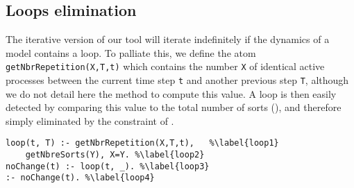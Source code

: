 \subsection{Loops elimination}
\label{sec:loops}

The iterative version of our tool will iterate indefinitely if the dynamics of a model contains a loop.
To palliate this,
we define the atom \texttt{getNbrRepetition(X,T,t)} which contains the number \texttt{X} of identical active processes
between the current time step \texttt{t} and another previous step \texttt{T},
although we do not detail here the method to compute this value.
A loop is then easily detected by comparing this value to the total number of sorts (),
and therefore simply eliminated by the constraint of .
\begin{lstlisting}
loop(t, T) :- getNbrRepetition(X,T,t),   %\label{loop1}
	getNbreSorts(Y), X=Y. %\label{loop2}
noChange(t) :- loop(t, _). %\label{loop3}
:- noChange(t). %\label{loop4}
\end{lstlisting}
